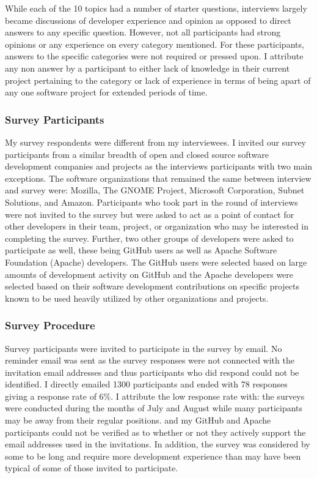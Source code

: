 While each of the 10 topics had a number of starter questions, interviews 
largely became discussions of developer experience and opinion as opposed to direct answers to any specific question.
However, not all participants had strong opinions or any experience on every category mentioned. For these participants, answers 
to the specific categories were not required or pressed upon. I attribute any non answer by a participant to
either lack of knowledge in their current project pertaining to the category or lack of experience in terms of
being apart of any one software project for extended periods of time. 

\subsubsection{Survey Participants}

My survey respondents were different from my interviewees. I invited our survey participants from a similar breadth of open and closed source software development 
companies and projects as the interviews participants with two main exceptions. The software organizations
that remained the same between interview and survey were: Mozilla, The GNOME Project, Microsoft Corporation, 
Subnet Solutions, and Amazon.
Participants who took part in the round of interviews were not invited to the survey but were asked to act as a point of contact for other 
developers in their team, project, or organization who may be interested
in completing the survey. Further, two other groups of developers were asked to
participate as well, these being GitHub users as well as Apache Software Foundation (Apache) developers. The GitHub
users were selected based on large amounts of development activity on GitHub and the Apache developers
were selected based on their software development contributions on specific projects known to be used heavily
utilized by other organizations and projects.

\subsubsection{Survey Procedure}

Survey participants were invited to participate in the survey by email. No reminder email was sent as the
survey responses were not connected with the invitation email addresses and thus participants who did respond
could not be identified. I directly emailed 1300 participants and ended with 78 responses
giving a response rate of 6\%. I attribute the low response rate with: the surveys
were conducted during the months of July and August while many participants may be away from their regular positions.
and my GitHub and Apache participants could not be verified as to whether or not they actively support the
email addresses used in the invitations. In addition, the survey was considered by some to be long and require
more development experience than may have been typical of some of those invited to participate.

